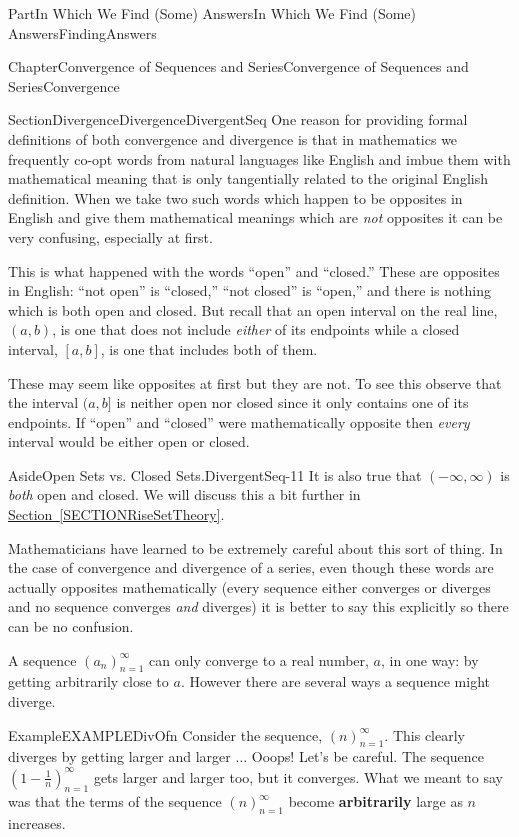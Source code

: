 \documentclass[oneside,10pt,]{book}
\newcommand{\xreffont}{\relax}
\newcommand{\terminology}[1]{\textbf{#1}}
\numberwithin{equation}{part}
\begin{document}
\begin{partptx}{Part}{In Which We Find (Some) Answers}{}{In Which We Find (Some) Answers}{}{}{FindingAnswers}
\begin{chapterptx}{Chapter}{Convergence of Sequences and Series}{}{Convergence of Sequences and Series}{}{}{Convergence}
\begin{sectionptx}{Section}{Divergence}{}{Divergence}{}{}{DivergentSeq}
One reason for providing formal definitions of both convergence and divergence is that in mathematics we frequently co-opt words from natural languages like English and imbue them with mathematical meaning that is only tangentially related to the original English definition. When we take two such words which happen to be opposites in English and give them mathematical meanings which are \emph{not} opposites it can be very confusing, especially at first.%
\par
This is what happened with the words ``open'' and ``closed.'' These are opposites in English: ``not open'' is ``closed,'' ``not closed'' is ``open,'' and there is nothing which is both open and closed.  But recall that an open interval on the real line, \((a,b)\), is one that does not include \emph{either} of its endpoints while a closed interval, \([a,b]\), is one that includes both of them.%
\par
These may seem like opposites at first but they are not.  To see this observe that the interval \((a,b]\) is neither open nor closed since it only contains one of its endpoints. If ``open'' and ``closed'' were mathematically opposite then \emph{every} interval would be either open or closed.%
\begin{aside}{Aside}{Open Sets vs. Closed Sets.}{DivergentSeq-11}%
It is also true that \((-\infty,\infty)\) is \emph{both} open and closed. We will discuss this a bit further in \hyperref[SECTIONRiseSetTheory]{Section~{\xreffont\ref{SECTIONRiseSetTheory}}}.%
\end{aside}
Mathematicians have learned to be extremely careful about this sort of thing. In the case of convergence and divergence of a series, even though these words are actually opposites mathematically (every sequence either converges or diverges and no sequence converges \emph{and} diverges) it is better to say this explicitly so there can be no confusion.%
\par
A sequence \(\left(a_n\right)_{n=1}^\infty\) can only converge to a real number, \(a\), in one way: by getting arbitrarily close to \(a\). However there are several ways a sequence might diverge.%
\begin{example}{Example}{}{EXAMPLEDivOfn}%
Consider the sequence, \(\left(n\right)_{n=1}^\infty\). This clearly diverges by getting larger and larger \(\ldots\) Ooops! Let's be careful. The sequence \(\left(1-\frac1n\right)_{n=1}^\infty\) gets larger and larger too, but it converges. What we meant to say was that the terms of the sequence \(\left(n\right)_{n=1}^\infty\) become \terminology{arbitrarily} large as \(n\) increases.%

\end{example}
\end{sectionptx}
\end{chapterptx}
\end{partptx}
\end{document}
